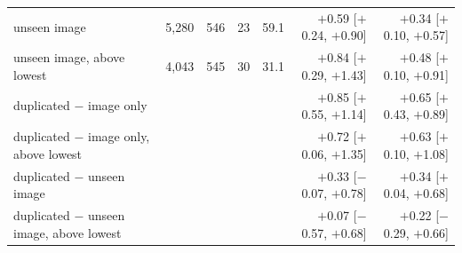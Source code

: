\begin{tabular}{lrrrrrr}
\quad unseen image & 5,280 & 546 & 23 & 59.1 & $+$0.59 [$+$0.24, $+$0.90] & $+$0.34 [$+$0.10, $+$0.57] \\
\quad unseen image, above lowest & 4,043 & 545 & 30 & 31.1 & $+$0.84 [$+$0.29, $+$1.43] & $+$0.48 [$+$0.10, $+$0.91] \\
\quad duplicated $-$ image only & & & & & $+$0.85 [$+$0.55, $+$1.14] & $+$0.65 [$+$0.43, $+$0.89] \\
\quad duplicated $-$ image only, above lowest & & & & & $+$0.72 [$+$0.06, $+$1.35] & $+$0.63 [$+$0.10, $+$1.08] \\
\quad duplicated $-$ unseen image & & & & & $+$0.33 [$-$0.07, $+$0.78] & $+$0.34 [$+$0.04, $+$0.68] \\
\quad duplicated $-$ unseen image, above lowest & & & & & $+$0.07 [$-$0.57, $+$0.68] & $+$0.22 [$-$0.29, $+$0.66] \\
\bottomrule
\end{tabular}
